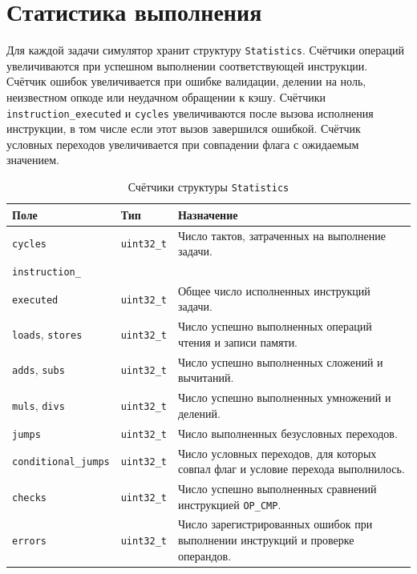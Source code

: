 \documentclass[12pt,a4paper]{article}
\begin{document}
\section{Статистика выполнения}\label{sec:statistics}

Для каждой задачи симулятор хранит структуру \texttt{Statistics}. Счётчики операций увеличиваются при успешном выполнении соответствующей инструкции. Счётчик ошибок увеличивается при ошибке валидации, делении на ноль, неизвестном опкоде или неудачном обращении к кэшу. Счётчики \texttt{instruction\_executed} и \texttt{cycles} увеличиваются после вызова исполнения инструкции, в том числе если этот вызов завершился ошибкой. Счётчик условных переходов увеличивается при совпадении флага с ожидаемым значением.

\begin{table}[H]
    \centering
    \caption{Счётчики структуры \texttt{Statistics}}
    \label{tab:statistics}
    \begin{tabular}{|p{3.7cm}|p{2.8cm}|p{7cm}|}
        \hline
        \textbf{Поле} & \textbf{Тип} & \textbf{Назначение} \\
        \hline
        \texttt{cycles} & \texttt{uint32\_t} & Число тактов, затраченных на выполнение задачи. \\
        \hline
        \texttt{instruction\_}\\\texttt{executed} & \texttt{uint32\_t} & Общее число исполненных инструкций задачи. \\
        \hline
        \texttt{loads}, \texttt{stores} & \texttt{uint32\_t} & Число успешно выполненных операций чтения и записи памяти. \\
        \hline
        \texttt{adds}, \texttt{subs} & \texttt{uint32\_t} & Число успешно выполненных сложений и вычитаний. \\
        \hline
        \texttt{muls}, \texttt{divs} & \texttt{uint32\_t} & Число успешно выполненных умножений и делений. \\
        \hline
        \texttt{jumps} & \texttt{uint32\_t} & Число выполненных безусловных переходов. \\
        \hline
        \texttt{conditional\_jumps} & \texttt{uint32\_t} & Число условных переходов, для которых совпал флаг и условие перехода выполнилось. \\
        \hline
        \texttt{checks} & \texttt{uint32\_t} & Число успешно выполненных сравнений инструкцией \texttt{OP\_CMP}. \\
        \hline
        \texttt{errors} & \texttt{uint32\_t} & Число зарегистрированных ошибок при выполнении инструкций и проверке операндов. \\
        \hline
    \end{tabular}
\end{table}
\end{document}
